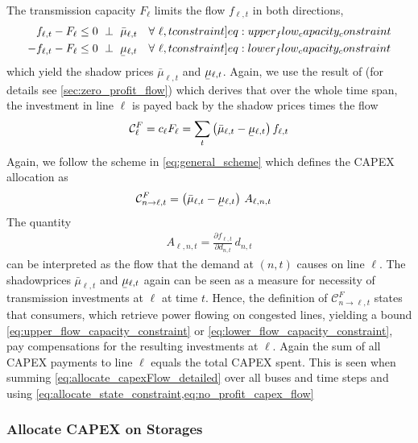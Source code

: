 \documentclass[11pt,twocolumn]{article}
\newcommand{\ubar}[1]{\underaccent{\bar}{#1}}
\newcommand{\resultsin}[1]{\hspace{6pt} \bot  \hspace{6pt} #1}
\newcommand{\Forall}[1]{\hspace{10pt} \forall \,\, #1 }
\newcommand{\pdv}[2]{\frac{\partial #1}{\partial #2}}
\newcommand{\flow}{f_{\ell,t}}
\newcommand{\capacityflow}{F_{\ell}}
\newcommand{\capitalpriceflow}{c_{\ell}}
\newcommand{\mulowerflow}{\ubar{\mu}_{\ell,t}}
\newcommand{\muupperflow}{\bar{\mu}_{\ell,t}}
\newcommand{\demand}[1][n]{d_{#1,t}}
\newcommand{\allocateflow}[1][n]{A_{\ell,#1,t}}
\newcommand{\allocatecapexflow}[1][n \rightarrow \ell]{\mathcal{C}^{F}_{#1,t}}
\newcommand{\capexflow}{\mathcal{C}^F}
\begin{document}
The transmission capacity $\capacityflow$ limits the flow $\flow$ in both directions,
\begin{align}
\flow - \capacityflow &\le 0 \resultsin{\muupperflow} \Forall{\ell,t} 
\label[constraint]{eq:upper_flow_capacity_constraint} \\
- \flow - \capacityflow &\le 0 \resultsin{\mulowerflow} \Forall{\ell,t} 
\label[constraint]{eq:lower_flow_capacity_constraint}
\end{align}
which yield the shadow prices $\muupperflow$ and $\mulowerflow$. Again, we use the result of \cite{brown_decreasing_2020} (for details see \cref{sec:zero_profit_flow}) which derives that over the whole time span, the investment in line $\ell$ is payed back by the shadow prices times the flow 
\begin{align}
\capexflow_\ell = \capitalpriceflow \capacityflow = \sum_{t} \left( \muupperflow - \mulowerflow \right)  \flow 
\label{eq:no_profit_capex_flow}
\end{align}
Again, we follow the scheme in \cref{eq:general_scheme} which  defines the CAPEX allocation as 
\begin{align}
    \allocatecapexflow &=  
   \left( \muupperflow - \mulowerflow\right) \, \allocateflow
   \label{eq:allocate_capexFlow_detailed}
\end{align}
The quantity 
\begin{align}
 \allocateflow =  \pdv{\flow}{\demand}\, \demand
\end{align}
can be interpreted as the flow that the demand at $\left(n,t\right)$ causes on line $\ell$.
The  shadowprices $\muupperflow$ and $\mulowerflow$ again can be seen as a measure for necessity of transmission investments at $\ell$ at time $t$. Hence, the definition of $\allocatecapexflow$ states that consumers, which retrieve power flowing on congested lines, yielding a bound \cref{eq:upper_flow_capacity_constraint} or \eqref{eq:lower_flow_capacity_constraint}, pay compensations for the resulting investments at $\ell$. Again the sum of all CAPEX payments to line $\ell$ equals the total CAPEX spent. This is seen when summing \cref{eq:allocate_capexFlow_detailed} over all buses and time steps and using \cref{eq:allocate_state_constraint,eq:no_profit_capex_flow}


\subsubsection*{Allocate CAPEX on Storages}
\end{document}
